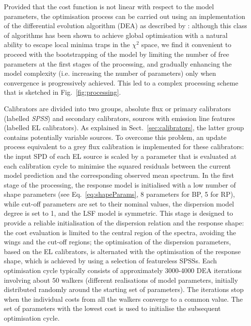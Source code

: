 \documentclass{aa}
\newcommand{\wrt}{with respect to\xspace}
\newcommand{\secname}{Sect.}
\newcommand{\equref}[1]{Eq.~\ref{eq:#1}}
\newcommand{\secref}[1]{\secname~\ref{sec:#1}}
\newcommand{\figref}[1]{Fig.~\ref{fig:#1}}
\begin{document}
Provided that the cost function is not linear \wrt the model parameters, the  optimisation process can be carried out using an implementation of the differential evolution algorithm (DEA) as described by \citet{storn}: although this class of algorithms has been shown to achieve global optimisation with a natural ability to escape  local minima traps in the $\chi^2$ space, 
we find it convenient to proceed with the bootstrapping of the model by limiting the number of free parameters at the first stages of the processing,  and 
gradually enhancing the model complexity (i.e. increasing the number of parameters) only when convergence is progressively achieved. This led to a complex processing scheme that is sketched in \figref{processing}. 

Calibrators are divided into two groups, absolute flux or primary calibrators (labelled \emph{SPSS}) and secondary calibrators, sources with emission line features (labelled {EL calibrators}). As explained in \secref{calibrators}, the latter group contains potentially variable sources. To overcome this problem, 
an update process equivalent to a grey flux calibration is implemented for these calibrators: the input SPD of each EL source is scaled by a parameter that is evaluated at each calibration cycle to  
minimise the squared residuals between the current model prediction and the corresponding observed mean spectrum.
In the first stage of the processing, the response model is initialised with a low number of shape parameters (see \equref{shapeParams}, 8 parameters for BP, 5 for RP), while cut-off parameters are set to their nominal values, the dispersion model degree is set to 1, and the LSF model is symmetric. This stage is designed to provide a reliable initialisation of the dispersion relation and the response shape: the cost evaluation is limited to the central region of the spectra, avoiding the wings and the cut-off regions; the optimisation of the dispersion parameters, based on the EL calibrators, is alternated with the optimisation of the response shape, which is achieved by using a selection of featureless SPSSs. 
Each optimisation cycle typically consists of approximately 3000-4000 DEA iterations  involving about $50$  walkers (different realisations of model parameters, initially distributed randomly around the starting set of parameters). The iterations stop when the individual costs from all the walkers converge to a common value. The set of parameters with the lowest cost is used to initialise the subsequent optimisation cycle.
\end{document}
